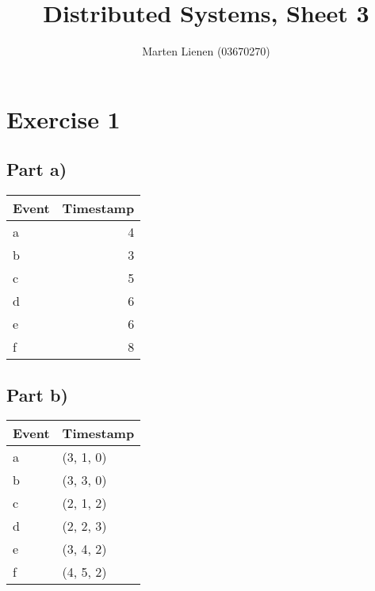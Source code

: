\documentclass[10pt,a4paper]{article}
\title{Distributed Systems, Sheet 3}
\author{Marten Lienen (03670270)}
\begin{document}
\maketitle

\section*{Exercise 1}

\subsection*{Part a)}

\begin{tabular}{lr}
Event & Timestamp\\
\hline
a & 4\\
b & 3\\
c & 5\\
d & 6\\
e & 6\\
f & 8\\
\end{tabular}
\begin{comment}
#+ORGTBL: SEND logical-timestamps orgtbl-to-latex :splice nil :skip 0
| Event | Timestamp |
|-------+-----------|
| a     |         4 |
| b     |         3 |
| c     |         5 |
| d     |         6 |
| e     |         6 |
| f     |         8 |
\end{comment}

\subsection*{Part b)}

\begin{tabular}{ll}
Event & Timestamp\\
\hline
a & (3, 1, 0)\\
b & (3, 3, 0)\\
c & (2, 1, 2)\\
d & (2, 2, 3)\\
e & (3, 4, 2)\\
f & (4, 5, 2)\\
\end{tabular}
\begin{comment}
#+ORGTBL: SEND vector-timestamps orgtbl-to-latex :splice nil :skip 0
| Event | Timestamp |
|-------+-----------|
| a     | (3, 1, 0) |
| b     | (3, 3, 0) |
| c     | (2, 1, 2) |
| d     | (2, 2, 3) |
| e     | (3, 4, 2) |
| f     | (4, 5, 2) |
\end{comment}
\end{document}
